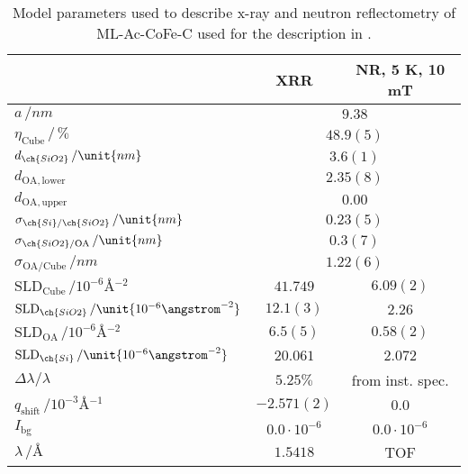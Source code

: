 \documentclass[\main/dresen_thesis.tex]{subfiles}
\begin{document}
  \begin{table}[ht]
    \centering
    \caption{\label{tab:monolayers:structure:ML-Ac-CoFe-C-WithSpacer}Model parameters used to describe x-ray and neutron reflectometry of ML-Ac-CoFe-C used for the description in .}
    \begin{tabular}{l | c | c}
      \hline
      &
      XRR &
      NR, 5 K, 10 mT\\
      \hline
      $a \, / \unit{nm}$ &
      \multicolumn{2}{c}{$9.38$} \\
      \hline
      $\eta_\mathrm{Cube} \, /\, \%$ &
        \multicolumn{2}{c}{$48.9(5) $} \\
      $d_{\ch{SiO2}} \, / \unit{nm}$ &
        \multicolumn{2}{c}{$3.6(1)$} \\
      $d_{\mathrm{OA, lower}}$ &
        \multicolumn{2}{c}{$2.35(8)$} \\
      $d_{\mathrm{OA, upper}}$ &
        \multicolumn{2}{c}{$0.00$} \\
      $\sigma_{\ch{Si}/\ch{SiO2}} \, / \unit{nm}$ &
        \multicolumn{2}{c}{$0.23(5)$} \\
      $\sigma_{\ch{SiO2}/\mathrm{OA}}\, / \unit{nm}$ &
        \multicolumn{2}{c}{$0.3(7)$} \\
      $\sigma_\mathrm{OA/Cube} \, / \unit{nm}$ &
        \multicolumn{2}{c}{$1.22(6)$} \\
      $\mathrm{SLD}_\mathrm{Cube} \, / \unit{10^{-6} \angstrom^{-2}}$ &
        $41.749$ &
        $6.09(2)$ \\
      $\mathrm{SLD}_{\ch{SiO2}} \, / \unit{10^{-6} \angstrom^{-2}}$ &
        $12.1(3)$ &
        $2.26$ \\
      $\mathrm{SLD}_\mathrm{OA} \, / \unit{10^{-6} \angstrom^{-2}}$ &
        $6.5(5)$ &
        $0.58(2)$ \\
      \hline
      $\mathrm{SLD}_{\ch{Si}} \, / \unit{10^{-6} \angstrom^{-2}}$ &
        $20.061$ &
        $2.072$ \\
      $\Delta \lambda / \lambda$ &
        $5.25 \%$ &
        from inst. spec.\\
      $q_\mathrm{shift} \,/ \unit{10^{-3} \angstrom^{-1}}$ &
        $-2.571(2)$ &
        $0.0$\\
      $I_\mathrm{bg}$ &
        $0.0 \cdot 10^{-6}$ &
        $0.0 \cdot 10^{-6}$ \\
      $\lambda \, / \unit{\angstrom}$ &
        $1.5418$&
        TOF\\
      \hline
    \end{tabular}
  \end{table}
\end{document}
